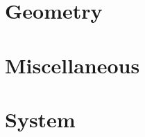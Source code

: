 \documentclass[10pt]{book}
\begin{document}
\chapter{Geometry}\label{sec:geometry}

\chapter{Miscellaneous}\label{sec:misc}

\chapter{System}\label{sec:system}

\cleardoublepage


\printindex
{}
\cleardoublepage
\end{document}
